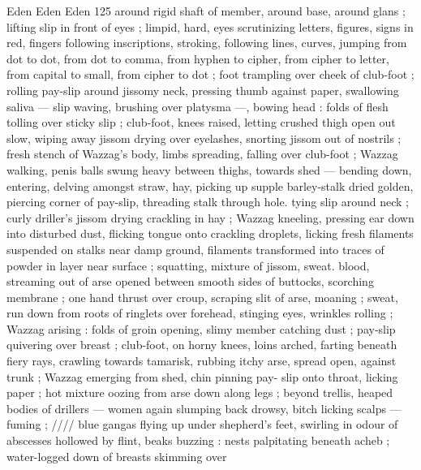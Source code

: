 Eden Eden Eden 125
around rigid shaft of member, around base, around glans ; lifting slip
in front of eyes ; limpid, hard, eyes scrutinizing letters, figures, signs
in red, fingers following inscriptions, stroking, following lines,
curves, jumping from dot to dot, from dot to comma, from hyphen to
cipher, from cipher to letter, from capital to small, from cipher to dot
; foot trampling over cheek of club-foot ; rolling pay-slip around
jissomy neck, pressing thumb against paper, swallowing saliva —
slip waving, brushing over platysma —, bowing head : folds of flesh
tolling over sticky slip ; club-foot, knees raised, letting crushed thigh
open out slow, wiping away jissom drying over eyelashes, snorting
jissom out of nostrils ; fresh stench of Wazzag's body, limbs
spreading, falling over club-foot ; Wazzag walking, penis balls swung
heavy between thighs, towards shed — bending down, entering,
delving amongst straw, hay, picking up supple barley-stalk dried
golden, piercing corner of pay-slip, threading stalk through hole.
tying slip around neck ; curly driller's jissom drying crackling in hay
; Wazzag kneeling, pressing ear down into disturbed dust, flicking
tongue onto crackling droplets, licking fresh filaments suspended on
stalks near damp ground, filaments transformed into traces of
powder in layer near surface ; squatting, mixture of jissom, sweat.
blood, streaming out of arse opened between smooth sides of
buttocks, scorching membrane ; one hand thrust over croup, scraping
slit of arse, moaning ; sweat, run down from roots of ringlets over
forehead, stinging eyes, wrinkles rolling ; Wazzag arising : folds of
groin opening, slimy member catching dust ; pay-slip quivering over
breast ; club-foot, on horny knees, loins arched, farting beneath
fiery rays, crawling towards tamarisk, rubbing itchy arse, spread
open, against trunk ; Wazzag emerging from shed, chin pinning pay-
slip onto throat, licking paper ; hot mixture oozing from arse down
along legs ; beyond trellis, heaped bodies of drillers — women
again slumping back drowsy, bitch licking scalps — fuming ; //// blue
gangas flying up under shepherd's feet, swirling in odour of
abscesses hollowed by flint, beaks buzzing : nests palpitating
beneath acheb ; water-logged down of breasts skimming over

